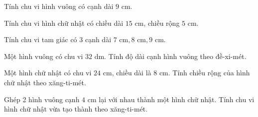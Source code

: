 \begin{ex} %
Tính chu vi hình vuông có cạnh dài $9\text{ cm}$.
\end{ex}

\begin{ex} %
Tính chu vi hình chữ nhật có chiều dài $15\text{ cm}$, chiều rộng $5\text{ cm}$.
\end{ex}

\begin{ex} %
Tính chu vi tam giác có 3 cạnh dài $7\text{ cm}, 8\text{ cm}, 9\text{ cm}$.
\end{ex}

\begin{ex} %
Một hình vuông có chu vi $32\text{ dm}$. Tính độ dài cạnh hình vuông theo đề-xi-mét.
\end{ex}

\begin{ex} %
Một hình chữ nhật có chu vi $24\text{ cm}$, chiều dài là $8\text{ cm}$. Tính chiều rộng của hình chữ nhật theo xăng-ti-mét.
\end{ex}

\begin{ex} %
Ghép 2 hình vuông cạnh $4\text{ cm}$ lại với nhau thành một hình chữ nhật. Tính chu vi hình chữ nhật vừa tạo thành theo xăng-ti-mét.
\end{ex}
